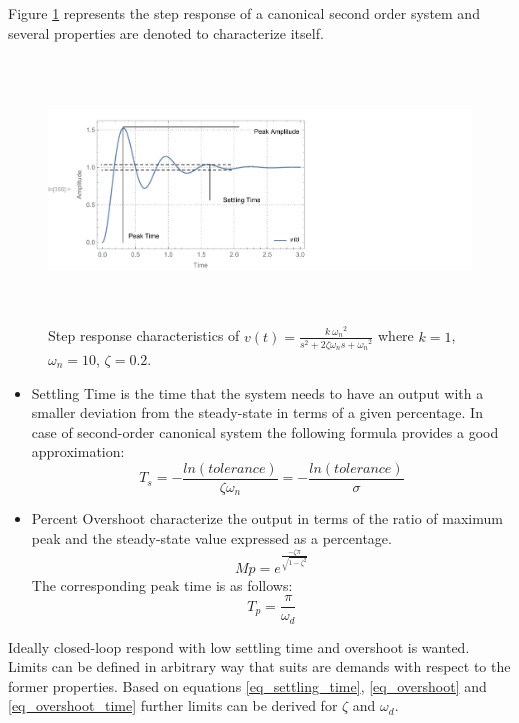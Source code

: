 \documentclass[12pt,english,twoside]{article}
\begin{document}
Figure \ref{second_order_underdamped_response} represents the step response of a canonical second order system and several properties are denoted to characterize itself.
\begin{figure}[htb!]
	\centering
	\includegraphics[height=7cm]{figures/step_response_of_2nd_order_system_1}
	\caption{Step response characteristics of $v(t)=\frac{k ~ {\omega_n}^2}{s^2+2 \zeta \omega_n s + {\omega_n}^2}$ where $k=1$, ${\omega_n}=10$, $\zeta=0.2$.}
	\label{second_order_underdamped_response}
\end{figure}
\begin{itemize}
	\item Settling Time is the time that the system needs to have an output with a smaller deviation from the steady-state in terms of a given percentage. In case of second-order canonical system the following formula provides a good approximation: \cite{dc_motor_3}
	\begin{equation}
	T_s = -\frac{ln(tolerance)}{\zeta \omega_n} = -\frac{ln(tolerance)}{\sigma}
	\label{eq_settling_time}
	\end{equation}
	\item Percent Overshoot characterize the output in terms of the ratio of maximum peak and the steady-state value expressed as a percentage. \cite{dc_motor_3}
	\begin{equation}
	Mp = e^{\frac{-\zeta \pi}{\sqrt{1-\zeta^2}}}
	\label{eq_overshoot}
	\end{equation}
	The corresponding peak time is as follows: \cite{dc_motor_3}
	\begin{equation}
	T_p = \frac{\pi}{\omega_d}
	\label{eq_overshoot_time}
	\end{equation}
\end{itemize}
Ideally closed-loop respond with low settling time and overshoot is wanted. Limits can be defined in arbitrary way that suits are demands with respect to the former properties. Based on equations \ref{eq_settling_time}, \ref{eq_overshoot} and \ref{eq_overshoot_time} further limits can be derived for $\zeta$ and $\omega_d$.
\end{document}
